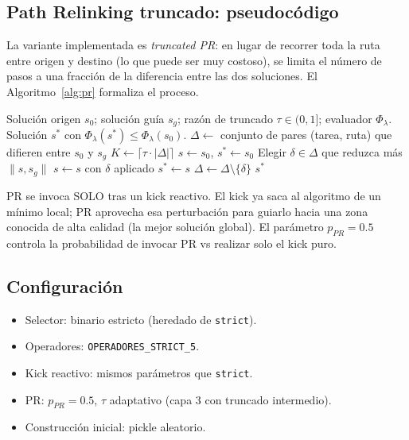 \documentclass[11pt,a4paper]{article}
\theoremstyle{definition}
\theoremstyle{remark}
\begin{document}
\subsection{Path Relinking truncado: pseudocódigo}

La variante implementada es \emph{truncated PR}: en lugar de recorrer
toda la ruta entre origen y destino (lo que puede ser muy costoso), se
limita el número de pasos a una fracción de la diferencia entre las
dos soluciones. El Algoritmo~\ref{alg:pr} formaliza el proceso.

\begin{algorithm}[h]
\caption{Path Relinking truncado (capa 3).}
\label{alg:pr}
\begin{algorithmic}[1]
\Require Solución origen $s_0$; solución guía $s_g$; razón de truncado
  $\tau \in (0,1]$; evaluador $\Phi_\lambda$.
\Ensure Solución $s^*$ con $\Phi_\lambda(s^*) \le \Phi_\lambda(s_0)$.
\State $\Delta \gets$ conjunto de pares (tarea, ruta) que difieren entre $s_0$ y $s_g$
\State $K \gets \lceil \tau \cdot |\Delta| \rceil$
\State $s \gets s_0$, $s^* \gets s_0$
  \State Elegir $\delta \in \Delta$ que reduzca más $\|s, s_g\|$
  \State $s \gets s$ con $\delta$ aplicado
    \State $s^* \gets s$
  \EndIf
  \State $\Delta \gets \Delta \setminus \{\delta\}$
\EndFor
\State \Return $s^*$
\end{algorithmic}
\end{algorithm}

PR se invoca SOLO tras un kick reactivo. El kick ya saca al algoritmo
de un mínimo local; PR aprovecha esa perturbación para guiarlo hacia
una zona conocida de alta calidad (la mejor solución global). El
parámetro $p_{PR} = 0.5$ controla la probabilidad de invocar PR vs
realizar solo el kick puro.

\subsection{Configuración}

\begin{itemize}
\item Selector: binario estricto (heredado de \texttt{strict}).
\item Operadores: \texttt{OPERADORES\_STRICT\_5}.
\item Kick reactivo: mismos parámetros que \texttt{strict}.
\item PR: $p_{PR} = 0.5$, $\tau$ adaptativo (capa 3 con
  truncado intermedio).
\item Construcción inicial: pickle aleatorio.
\end{itemize}
\end{document}
